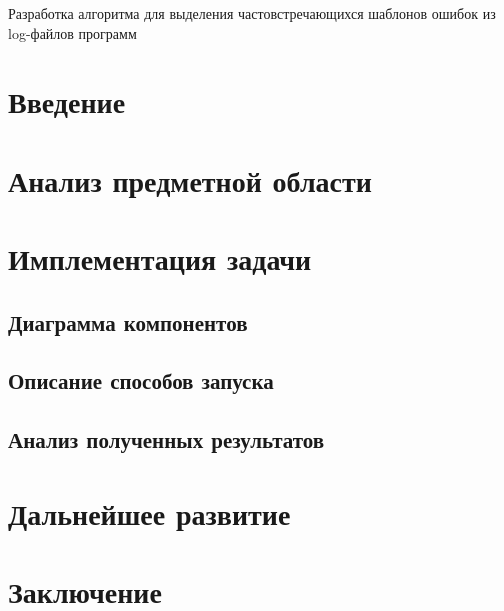 \documentclass[a4paper,12pt]{report}
\theoremstyle{plain}
\theoremstyle{definition}
\theoremstyle{remark}
\begin{document}



  Разработка алгоритма для выделения частовстречающихся шаблонов ошибок из log-файлов программ
  \tableofcontents

  \chapter*{Введение}
  
  \chapter{Анализ предметной области}
  

  \chapter{Имплементация задачи}
  \section{Диаграмма компонентов}
  \section{Описание способов запуска}
  \section{Анализ полученных результатов}

  \chapter{Дальнейшее развитие}



  \chapter*{Заключение}

\end{document}
